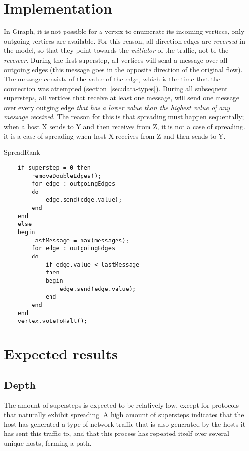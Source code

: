 \section{Implementation}
\label{sec:implementation}
In Giraph, it is not possible for a vertex to enumerate its incoming vertices, only outgoing vertices are available.
For this reason, all direction edges are \emph{reversed} in the model, so that they point towards the \emph{initiator} of the traffic, not to the \emph{receiver}.
During the first superstep, all vertices will send a message over all outgoing edges (this message goes in the opposite direction of the original flow).
The message consists of the value of the edge, which is the time that the connection was attempted (section~\ref{sec:data-types}).
During all subsequent supersteps, all vertices that receive at least one message, will send one message over every outging edge \emph{that has a lower value than the highest value of any message received}.
The reason for this is that spreading must happen sequentally;
 when a host X sends to Y and then receives from Z, it is not a case of spreading.
it is a case of spreading when host X receives from Z and then sends to Y.



\begin{algorithm}[h]
	\caption{SpreadRank}
	\begin{verbatim}
	if superstep = 0 then
	    removeDoubleEdges();
	    for edge : outgoingEdges
	    do
	        edge.send(edge.value);
	    end
	end
	else
	begin
	    lastMessage = max(messages);
	    for edge : outgoingEdges
	    do
	        if edge.value < lastMessage
	        then
	        begin
	            edge.send(edge.value);
	        end
	    end
	end
	vertex.voteToHalt();
	\end{verbatim}
\end{algorithm}


\section{Expected results}

\subsection{Depth}
\label{sec:depth}
The amount of supersteps is expected to be relatively low, except for protocols that naturally exhibit spreading.
A high amount of supersteps indicates that the host has generated a type of network traffic that is also generated by the hosts it has sent this traffic to, and that this process has repeated itself over several unique hosts, forming a path.


